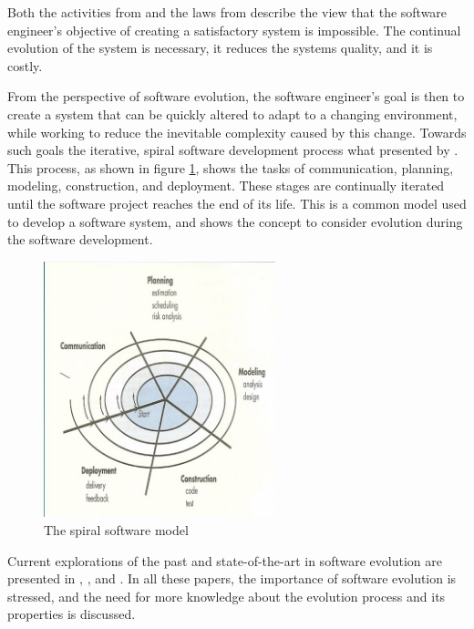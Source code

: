 Both the activities from \cite{Lientz1980} and the laws from \citep{lehman1980} describe the view that
the software engineer's objective of creating a satisfactory system is impossible.
The continual evolution of the system is necessary, it reduces the systems quality, and it is costly.

From the perspective of software evolution, the software engineer's goal is then to create a system that can be quickly altered to adapt to a changing environment, 
while working to reduce the inevitable complexity caused by this change.
Towards such goals the iterative, spiral software development process what presented by \citep{Boehm1988}.
This process, as shown in figure \ref{background.spiral},
shows the tasks of communication, planning, modeling, construction, and deployment. 
These stages are continually iterated until the software project reaches the end of its life. 
This is a common model used to develop a software system, and shows the concept to consider evolution during the software development. 
\begin{figure}[h!]
\begin{center}
  \includegraphics[width=0.6\textwidth]{backgroundpics/spiral}
  \caption{The spiral software model}
  \label{background.spiral}
\end{center}
\end{figure}

Current explorations of the past and state-of-the-art in software evolution are presented in \citep{Bennett2000}, \citep{Lehman2003}, and \citep{Godfrey2008}.
In all these papers, the importance of software evolution is stressed, and the need for more knowledge about the evolution process and its properties is discussed.

